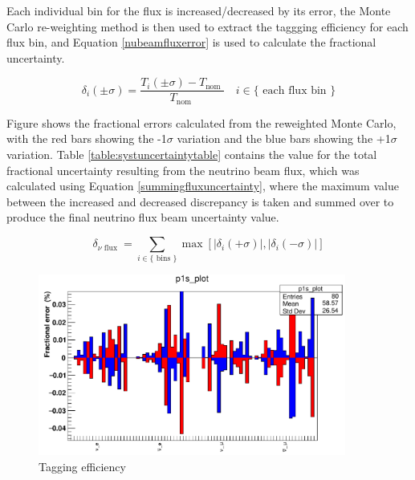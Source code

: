 \documentclass{article}
\begin{document}
Each individual bin for the flux is increased/decreased by its error, the Monte Carlo re-weighting method is then used to extract the taggging efficiency for each flux bin, and Equation \eqref{nubeamfluxerror} is used to calculate the fractional uncertainty.

\begin{equation}
\delta_{i}(\pm \sigma)=\frac{T_{i}(\pm \sigma)-T_{\text {nom }}}{T_{\text {nom }}} \quad i \in\{\text { each flux bin }\}
\label{eq:nubeamfluxerror}
\end{equation}

Figure  shows the fractional errors calculated from the reweighted Monte Carlo, with the red bars showing the -1$\sigma$ variation and the blue bars showing the +1$\sigma$ variation. Table \ref{table:systuncertaintytable} contains the value for the total fractional uncertainty resulting from the neutrino beam flux, which was calculated using Equation \eqref{summingfluxuncertainty}, where the maximum value between the increased and decreased discrepancy is taken and summed over to produce the final neutrino flux beam uncertainty value.

\begin{equation}
\delta_{\nu \text { flux }}=\sum_{i \in\{\text { bins }\}} \max \left[\left|\delta_{i}(+\sigma)\right|,\left|\delta_{i}(-\sigma)\right|\right]
\end{equation}

\begin{figure}[here]
\includegraphics[width=0.9\textwidth]{flux_uncertainty.png}
\caption{Tagging efficiency }
\label{fig:fluxuncertainty}
\end{figure}
\end{document}
